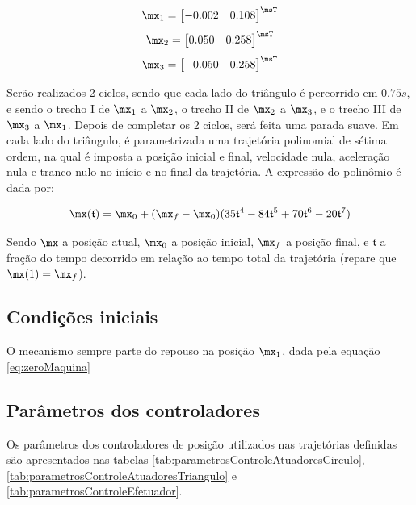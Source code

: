 \documentclass[]{politex}
\begin{document}
\begin{equation} \label{eq:zeroMaquina}
\mx_1 = \begin{bmatrix}
-0.002 & 0.108 
\end{bmatrix}^\msT
\end{equation}
\begin{equation}
\mx_2 = \begin{bmatrix}
0.050 & 0.258 
\end{bmatrix}^\msT
\end{equation}
\begin{equation}
\mx_3 = \begin{bmatrix}
-0.050 & 0.258 
\end{bmatrix}^\msT
\end{equation}

Serão realizados 2 ciclos, sendo que cada lado do triângulo é percorrido em $0.75s$, e sendo o trecho I de $\mx_1$ a $\mx_2$, o trecho II de $\mx_2$ a $\mx_3$, e o trecho III de $\mx_3$ a $\mx_1$. Depois de completar os 2 ciclos, será feita uma parada suave. Em cada lado do triângulo, é parametrizada uma trajetória polinomial de sétima ordem, na qual é imposta a posição inicial e final, velocidade nula, aceleração nula e tranco nulo no início e no final da trajetória. A expressão do polinômio é dada por:

\begin{equation}
\mx(\mathfrak{t}) = \mx_0 + (\mx_f - \mx_0) (35 \mathfrak{t}^4 - 84 \mathfrak{t}^5 + 70 \mathfrak{t}^6 - 20 \mathfrak{t}^7)
\end{equation}

Sendo $\mx$ a posição atual, $\mx_0$ a posição inicial, $\mx_f$ a posição final, e $\mathfrak{t}$ a fração do tempo decorrido em relação ao tempo total da trajetória (repare que $\mx(1) = \mx_f$).

\subsection{Condições iniciais}

O mecanismo sempre parte do repouso na posição $\mx_1$, dada pela equação \eqref{eq:zeroMaquina}

\subsection{Parâmetros dos controladores}

Os parâmetros dos controladores de posição utilizados nas trajetórias definidas são apresentados nas tabelas \ref{tab:parametrosControleAtuadoresCirculo}, \ref{tab:parametrosControleAtuadoresTriangulo} e \ref{tab:parametrosControleEfetuador}.
\end{document}
